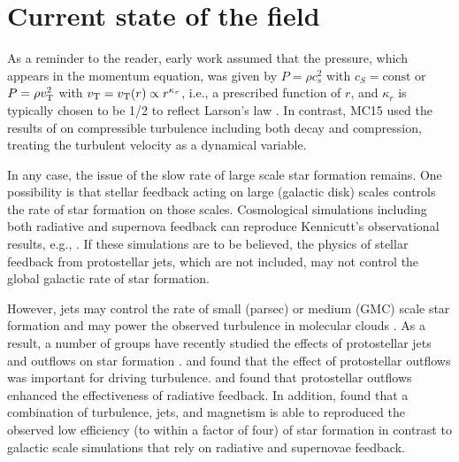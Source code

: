 \documentclass[../dissertation.tex]{subfiles}
\begin{document}

\section{Current state of the field}
As a reminder to the reader, early work \citep{1977ApJ...214..488S,1992ApJ...396..631M,1997ApJ...476..750M} assumed that the pressure, which appears in the momentum equation, was given by $P = \rho c_s^2$ with $c_S = \textrm{const}$ or $P = \rho v_{\rm T}^2$ with $v_{\rm T} = v_{\rm T}(r) \propto r^{\kappa_r}$, i.e., a prescribed function of $r$, and $\kappa_r$ is typically chosen to be 1/2 to reflect Larson's law \citep{1981MNRAS.194..809L}.
In contrast,  MC15 used the results of \citet{2012ApJ...750L..31R} on compressible turbulence including both decay and compression, treating the turbulent velocity as a dynamical variable.  

In any case, the issue of the slow rate of large scale star formation remains.
One possibility is that stellar feedback acting on large (galactic disk) scales controls the rate of star formation on those scales.
Cosmological simulations including both radiative and supernova feedback can reproduce Kennicutt's observational results, e.g., \cite{2011MNRAS.417..950H,2013ApJ...770...25A,2014MNRAS.445..581H}. If these simulations are to be believed, the physics of stellar feedback from protostellar jets, which are not included, may not control the global galactic rate of star formation.

However, jets may control the rate of small (parsec) or medium (GMC) scale star formation and may power the observed turbulence in molecular clouds \citep{2007ApJ...659.1394M}.
As a result, a number of groups have recently studied the effects of protostellar jets and outflows on star formation \citep{2010ApJ...709...27W,2014MNRAS.439.3420M,2015MNRAS.450.4035F}.
\citet{2007ApJ...662..395N} and \citet{2011ApJ...740...36N} found that the effect of protostellar outflows was important for driving turbulence.  \citet{2011ApJ...740..107C} and \citet{2012ApJ...747...22H} found that protostellar outflows enhanced the effectiveness of radiative feedback.  In addition, \citet{2015MNRAS.450.4035F} found that a combination of turbulence, jets, and magnetism is able to reproduced the observed low efficiency (to within a factor of four) of star formation in contrast to galactic scale simulations that rely on radiative and supernovae feedback.
\end{document}
